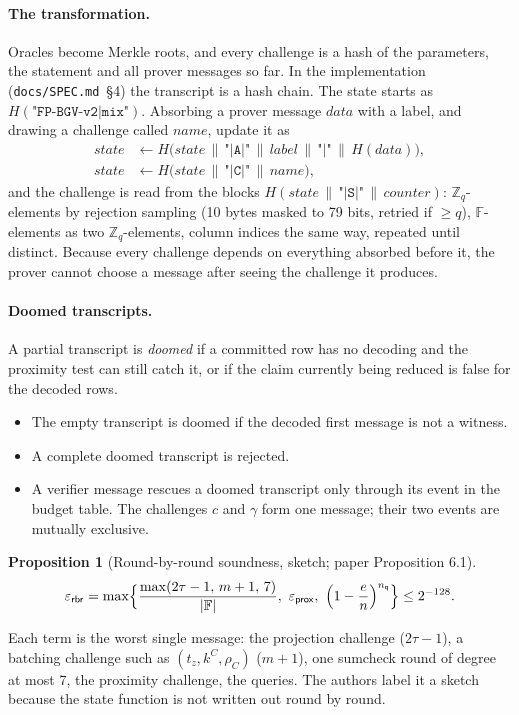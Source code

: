 \documentclass[11pt,a4paper]{article}
\newcommand{\Zq}{\mathbb{Z}_q}
\newcommand{\F}{\mathbb{F}}
\newcommand{\epsprox}{\varepsilon_{\mathsf{prox}}}
\newcommand{\epsrbr}{\varepsilon_{\mathsf{rbr}}}
\newcommand{\nq}{n_{\mathsf{q}}}
\theoremstyle{definition}
\theoremstyle{plain}
\newtheorem{proposition}[definition]{Proposition}
\begin{document}
\paragraph{The transformation.} Oracles become Merkle roots, and every challenge is a hash of the
parameters, the statement and all prover messages so far. In the implementation (\texttt{docs/SPEC.md}~\S4)
the transcript is a hash chain. The state starts as $H(\texttt{"FP-BGV-v2|mix"})$. Absorbing a prover message
$\mathit{data}$ with a label, and drawing a challenge called $\mathit{name}$, update it as
\begin{align*}
  \mathit{state}&\leftarrow H\bigl(\mathit{state}\,\|\,\texttt{"|A|"}\,\|\,\mathit{label}\,\|\,\texttt{"|"}\,\|\,H(\mathit{data})\bigr),\\
  \mathit{state}&\leftarrow H\bigl(\mathit{state}\,\|\,\texttt{"|C|"}\,\|\,\mathit{name}\bigr),
\end{align*}
and the challenge is read from the blocks $H(\mathit{state}\,\|\,\texttt{"|S|"}\,\|\,\mathit{counter})$:
$\Zq$-elements by rejection sampling (10 bytes masked to 79 bits, retried if $\ge q$), $\F$-elements as two
$\Zq$-elements, column indices the same way, repeated until distinct. Because every challenge depends on
everything absorbed before it, the prover cannot choose a message after seeing the challenge it produces.

\paragraph{Doomed transcripts.} A partial transcript is \emph{doomed} if a committed row has no decoding and
the proximity test can still catch it, or if the claim currently being reduced is false for the decoded rows.
\begin{itemize}[leftmargin=1.3em]
\item The empty transcript is doomed if the decoded first message is not a witness.
\item A complete doomed transcript is rejected.
\item A verifier message rescues a doomed transcript only through its event in the budget table. The
  challenges $c$ and $\gamma$ form one message; their two events are mutually exclusive.
\end{itemize}

\begin{proposition}[Round-by-round soundness, sketch; paper Proposition 6.1]
\[
  \epsrbr=\max\Bigl\{\frac{\max(2\tau-1,\,m+1,\,7)}{|\F|},\ \epsprox,\ \Bigl(1-\frac en\Bigr)^{\nq}\Bigr\}\le 2^{-128}.
\]
\end{proposition}
Each term is the worst single message: the projection challenge ($2\tau-1$), a batching challenge such as
$(t_z,k^C,\rho_C)$ ($m+1$), one sumcheck round of degree at most 7, the proximity challenge, the queries.
The authors label it a sketch because the state function is not written out round by round.
\end{document}
